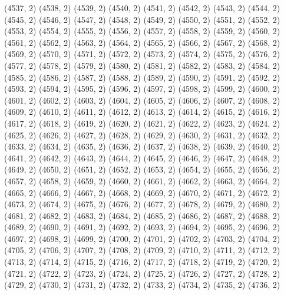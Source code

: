 {   (4537, 2)
   (4538, 2)
   (4539, 2)
   (4540, 2)
   (4541, 2)
   (4542, 2)
   (4543, 2)
   (4544, 2)
   (4545, 2)
   (4546, 2)
   (4547, 2)
   (4548, 2)
   (4549, 2)
   (4550, 2)
   (4551, 2)
   (4552, 2)
   (4553, 2)
   (4554, 2)
   (4555, 2)
   (4556, 2)
   (4557, 2)
   (4558, 2)
   (4559, 2)
   (4560, 2)
   (4561, 2)
   (4562, 2)
   (4563, 2)
   (4564, 2)
   (4565, 2)
   (4566, 2)
   (4567, 2)
   (4568, 2)
   (4569, 2)
   (4570, 2)
   (4571, 2)
   (4572, 2)
   (4573, 2)
   (4574, 2)
   (4575, 2)
   (4576, 2)
   (4577, 2)
   (4578, 2)
   (4579, 2)
   (4580, 2)
   (4581, 2)
   (4582, 2)
   (4583, 2)
   (4584, 2)
   (4585, 2)
   (4586, 2)
   (4587, 2)
   (4588, 2)
   (4589, 2)
   (4590, 2)
   (4591, 2)
   (4592, 2)
   (4593, 2)
   (4594, 2)
   (4595, 2)
   (4596, 2)
   (4597, 2)
   (4598, 2)
   (4599, 2)
   (4600, 2)
   (4601, 2)
   (4602, 2)
   (4603, 2)
   (4604, 2)
   (4605, 2)
   (4606, 2)
   (4607, 2)
   (4608, 2)
   (4609, 2)
   (4610, 2)
   (4611, 2)
   (4612, 2)
   (4613, 2)
   (4614, 2)
   (4615, 2)
   (4616, 2)
   (4617, 2)
   (4618, 2)
   (4619, 2)
   (4620, 2)
   (4621, 2)
   (4622, 2)
   (4623, 2)
   (4624, 2)
   (4625, 2)
   (4626, 2)
   (4627, 2)
   (4628, 2)
   (4629, 2)
   (4630, 2)
   (4631, 2)
   (4632, 2)
   (4633, 2)
   (4634, 2)
   (4635, 2)
   (4636, 2)
   (4637, 2)
   (4638, 2)
   (4639, 2)
   (4640, 2)
   (4641, 2)
   (4642, 2)
   (4643, 2)
   (4644, 2)
   (4645, 2)
   (4646, 2)
   (4647, 2)
   (4648, 2)
   (4649, 2)
   (4650, 2)
   (4651, 2)
   (4652, 2)
   (4653, 2)
   (4654, 2)
   (4655, 2)
   (4656, 2)
   (4657, 2)
   (4658, 2)
   (4659, 2)
   (4660, 2)
   (4661, 2)
   (4662, 2)
   (4663, 2)
   (4664, 2)
   (4665, 2)
   (4666, 2)
   (4667, 2)
   (4668, 2)
   (4669, 2)
   (4670, 2)
   (4671, 2)
   (4672, 2)
   (4673, 2)
   (4674, 2)
   (4675, 2)
   (4676, 2)
   (4677, 2)
   (4678, 2)
   (4679, 2)
   (4680, 2)
   (4681, 2)
   (4682, 2)
   (4683, 2)
   (4684, 2)
   (4685, 2)
   (4686, 2)
   (4687, 2)
   (4688, 2)
   (4689, 2)
   (4690, 2)
   (4691, 2)
   (4692, 2)
   (4693, 2)
   (4694, 2)
   (4695, 2)
   (4696, 2)
   (4697, 2)
   (4698, 2)
   (4699, 2)
   (4700, 2)
   (4701, 2)
   (4702, 2)
   (4703, 2)
   (4704, 2)
   (4705, 2)
   (4706, 2)
   (4707, 2)
   (4708, 2)
   (4709, 2)
   (4710, 2)
   (4711, 2)
   (4712, 2)
   (4713, 2)
   (4714, 2)
   (4715, 2)
   (4716, 2)
   (4717, 2)
   (4718, 2)
   (4719, 2)
   (4720, 2)
   (4721, 2)
   (4722, 2)
   (4723, 2)
   (4724, 2)
   (4725, 2)
   (4726, 2)
   (4727, 2)
   (4728, 2)
   (4729, 2)
   (4730, 2)
   (4731, 2)
   (4732, 2)
   (4733, 2)
   (4734, 2)
   (4735, 2)
   (4736, 2)
}

